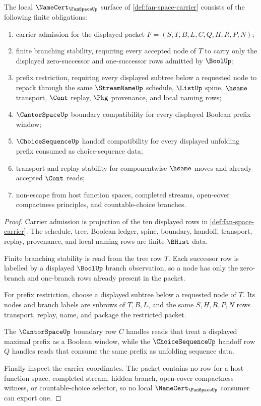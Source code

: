 \begin{theorem}
\label{thm:fan-space-namecert-obligations}
The local $\NameCert_{\FanSpaceUp}$ surface of
\autoref{def:fan-space-carrier} consists of the following finite obligations:
\begin{enumerate}
\item carrier admission for the displayed packet
$F=(S,T,B,L,C,Q,H,R,P,N)$;
\item finite branching stability, requiring every accepted node of $T$ to
carry only the displayed zero-successor and one-successor rows admitted by
$\BoolUp$;
\item prefix restriction, requiring every displayed subtree below a requested
node to repack through the same $\StreamNameUp$ schedule, $\ListUp$ spine,
$\hsame$ transport, $\Cont$ replay, $\Pkg$ provenance, and local naming rows;
\item $\CantorSpaceUp$ boundary compatibility for every displayed Boolean
prefix window;
\item $\ChoiceSequenceUp$ handoff compatibility for every displayed unfolding
prefix consumed as choice-sequence data;
\item transport and replay stability for componentwise $\hsame$ moves and
already accepted $\Cont$ reads;
\item non-escape from host function spaces, completed streams, open-cover
compactness principles, and countable-choice branches.
\end{enumerate}
\end{theorem}
\begin{proof}
Carrier admission is projection of the ten displayed rows in
\autoref{def:fan-space-carrier}. The schedule, tree, Boolean ledger, spine,
boundary, handoff, transport, replay, provenance, and local naming rows are
finite $\BHist$ data.

Finite branching stability is read from the tree row $T$. Each successor row
is labelled by a displayed $\BoolUp$ branch observation, so a node has only the
zero-branch and one-branch rows already present in the packet.

For prefix restriction, choose a displayed subtree below a requested node of
$T$. Its nodes and branch labels are subrows of $T,B,L$, and the same
$S,H,R,P,N$ rows transport, replay, name, and package the restricted packet.

The $\CantorSpaceUp$ boundary row $C$ handles reads that treat a displayed
maximal prefix as a Boolean window, while the $\ChoiceSequenceUp$ handoff row
$Q$ handles reads that consume the same prefix as unfolding sequence data.

Finally inspect the carrier coordinates. The packet contains no row for a
host function space, completed stream, hidden branch, open-cover compactness
witness, or countable-choice selector, so no local $\NameCert_{\FanSpaceUp}$
consumer can export one.
\end{proof}


